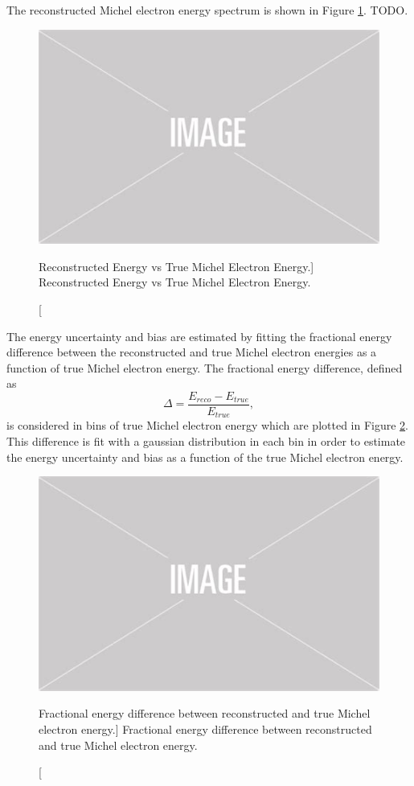 The reconstructed Michel electron energy spectrum is shown in Figure
\ref{fig:reco_v_mich}. TODO.
\begin{figure}
	\centering
	\includegraphics[width=\textwidth]{figures/placeholder.png}
	\caption
	[Reconstructed Energy vs True Michel Electron Energy.]
	{Reconstructed Energy vs True Michel Electron Energy.}
	\label{fig:reco_v_mich}
\end{figure}


The energy uncertainty and bias are estimated by fitting the fractional energy 
difference between the reconstructed and true Michel electron energies as a 
function of true Michel electron energy. The fractional energy difference, 
defined as 
\begin{equation}
	\Delta = \frac{E_{reco} - E_{true}}{E_{true}},
\end{equation}
is considered in bins of true Michel electron energy which are plotted in Figure
\ref{fig:frac_diff_energy}. This difference is fit with a gaussian distribution in each
bin in order to estimate the energy uncertainty and bias as a function of the 
true Michel electron energy.
\begin{figure}
	\centering
	\includegraphics[width=\textwidth]{figures/placeholder.png}
	\caption
	[Fractional energy difference between reconstructed and true Michel electron
	energy.]
	{Fractional energy difference between reconstructed and true Michel electron
	energy.}
	\label{fig:frac_diff_energy}
\end{figure}

